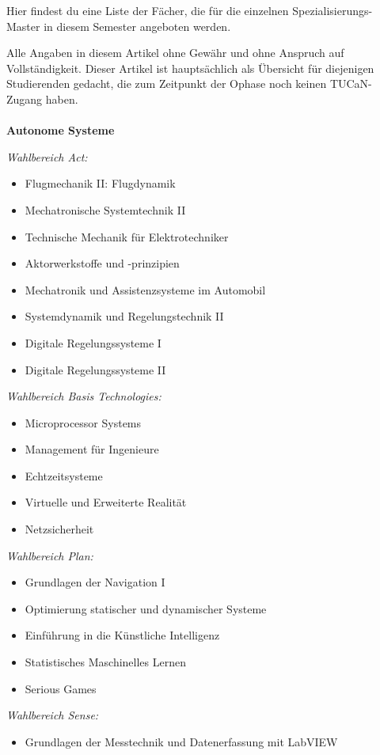 {Hier findest du eine Liste der Fächer, die für die einzelnen Spezialisierungs-Master in diesem Semester angeboten werden.}
{
Alle Angaben in diesem Artikel ohne Gewähr und ohne Anspruch auf Vollständigkeit. Dieser Artikel ist hauptsächlich als Übersicht für diejenigen Studierenden gedacht, die zum Zeitpunkt der Ophase noch keinen TUCaN-Zugang haben.
\\\\
\textbf{Autonome Systeme}

\textit{Wahlbereich Act:}
\begin{itemize}[noitemsep]
  \item Flugmechanik II: Flugdynamik
  \item Mechatronische Systemtechnik II
  \item Technische Mechanik für Elektrotechniker
  \item Aktorwerkstoffe und -prinzipien
  \item Mechatronik und Assistenzsysteme im Automobil
  \item Systemdynamik und Regelungstechnik II
  \item Digitale Regelungssysteme I
  \item Digitale Regelungssysteme II
\end{itemize}
\textit{Wahlbereich Basis Technologies:}
\begin{itemize}[noitemsep]
  \item Microprocessor Systems
  \item Management für Ingenieure
  \item Echtzeitsysteme
  \item Virtuelle und Erweiterte Realität
  \item Netzsicherheit
\end{itemize}
\textit{Wahlbereich Plan:}
\begin{itemize}[noitemsep]
  \item Grundlagen der Navigation I
  \item Optimierung statischer und dynamischer Systeme
  \item Einführung in die Künstliche Intelligenz
  \item Statistisches Maschinelles Lernen
  \item Serious Games
\end{itemize}
\textit{Wahlbereich Sense:}
\begin{itemize}[noitemsep]
  \item Grundlagen der Messtechnik und Datenerfassung mit LabVIEW

\end{itemize}}
